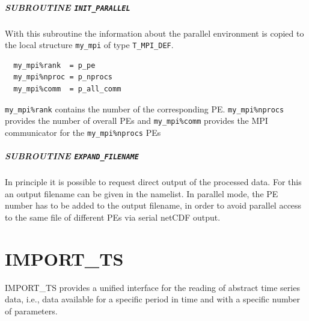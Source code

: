 \documentclass[11pt,twoside]{report}
\begin{document}
\paragraph{SUBROUTINE \color{blue} \tt\bf INIT\_PARALLEL\\ \label{IGPARINIT}}
With this subroutine the information about the parallel environment is
copied to the local structure \verb|my_mpi| of type \verb|T_MPI_DEF|.
\begin{verbatim}
  my_mpi%rank  = p_pe
  my_mpi%nproc = p_nprocs
  my_mpi%comm  = p_all_comm
\end{verbatim}
\verb|my_mpi%rank| contains the number of the corresponding PE. 
\verb|my_mpi%nprocs| provides the number of overall PEs  and 
\verb|my_mpi%comm| provides the MPI communicator for the 
\verb|my_mpi%nprocs| PEs 

\paragraph{SUBROUTINE \color{blue} \tt\bf EXPAND\_FILENAME\\ \label{IGPAREXPFILENAME}}
In principle it is possible to request direct output of the processed
data. For this an output filename can be given in the namelist. 
In parallel mode, the PE number has to be added to the output filename, in
order to avoid parallel access to the same file of different PEs via
serial netCDF output.

\chapter{IMPORT\_TS \label{IMPTS}}
IMPORT\_TS provides a unified interface for the reading of abstract
time series data, 
i.e., data available for a specific period in time and with a specific number
of parameters. 

\end{document}
